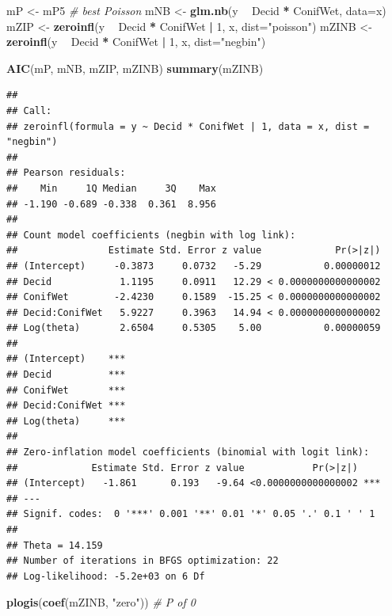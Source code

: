 \documentclass[12pt,]{book}
\newenvironment{Shaded}{\begin{snugshade}}{\end{snugshade}}
\newcommand{\CommentTok}[1]{\textcolor[rgb]{0.56,0.35,0.01}{\textit{#1}}}
\newcommand{\DataTypeTok}[1]{\textcolor[rgb]{0.13,0.29,0.53}{#1}}
\newcommand{\DecValTok}[1]{\textcolor[rgb]{0.00,0.00,0.81}{#1}}
\newcommand{\KeywordTok}[1]{\textcolor[rgb]{0.13,0.29,0.53}{\textbf{#1}}}
\newcommand{\NormalTok}[1]{#1}
\newcommand{\OperatorTok}[1]{\textcolor[rgb]{0.81,0.36,0.00}{\textbf{#1}}}
\newcommand{\StringTok}[1]{\textcolor[rgb]{0.31,0.60,0.02}{#1}}
\begin{document}
\begin{Shaded}
\begin{Highlighting}[]
\NormalTok{mP <-}\StringTok{ }\NormalTok{mP5 }\CommentTok{# best Poisson}
\NormalTok{mNB <-}\StringTok{ }\KeywordTok{glm.nb}\NormalTok{(y }\OperatorTok{~}\StringTok{ }\NormalTok{Decid }\OperatorTok{*}\StringTok{ }\NormalTok{ConifWet, }\DataTypeTok{data=}\NormalTok{x)}
\NormalTok{mZIP <-}\StringTok{ }\KeywordTok{zeroinfl}\NormalTok{(y }\OperatorTok{~}\StringTok{ }\NormalTok{Decid }\OperatorTok{*}\StringTok{ }\NormalTok{ConifWet }\OperatorTok{|}\StringTok{ }\DecValTok{1}\NormalTok{, x, }\DataTypeTok{dist=}\StringTok{"poisson"}\NormalTok{)}
\NormalTok{mZINB <-}\StringTok{ }\KeywordTok{zeroinfl}\NormalTok{(y }\OperatorTok{~}\StringTok{ }\NormalTok{Decid }\OperatorTok{*}\StringTok{ }\NormalTok{ConifWet }\OperatorTok{|}\StringTok{ }\DecValTok{1}\NormalTok{, x, }\DataTypeTok{dist=}\StringTok{"negbin"}\NormalTok{)}

\KeywordTok{AIC}\NormalTok{(mP, mNB, mZIP, mZINB)}
\KeywordTok{summary}\NormalTok{(mZINB)}
\end{Highlighting}
\end{Shaded}

\begin{verbatim}
## 
## Call:
## zeroinfl(formula = y ~ Decid * ConifWet | 1, data = x, dist = "negbin")
## 
## Pearson residuals:
##    Min     1Q Median     3Q    Max 
## -1.190 -0.689 -0.338  0.361  8.956 
## 
## Count model coefficients (negbin with log link):
##                Estimate Std. Error z value             Pr(>|z|)
## (Intercept)     -0.3873     0.0732   -5.29           0.00000012
## Decid            1.1195     0.0911   12.29 < 0.0000000000000002
## ConifWet        -2.4230     0.1589  -15.25 < 0.0000000000000002
## Decid:ConifWet   5.9227     0.3963   14.94 < 0.0000000000000002
## Log(theta)       2.6504     0.5305    5.00           0.00000059
##                   
## (Intercept)    ***
## Decid          ***
## ConifWet       ***
## Decid:ConifWet ***
## Log(theta)     ***
## 
## Zero-inflation model coefficients (binomial with logit link):
##             Estimate Std. Error z value            Pr(>|z|)    
## (Intercept)   -1.861      0.193   -9.64 <0.0000000000000002 ***
## ---
## Signif. codes:  0 '***' 0.001 '**' 0.01 '*' 0.05 '.' 0.1 ' ' 1 
## 
## Theta = 14.159 
## Number of iterations in BFGS optimization: 22 
## Log-likelihood: -5.2e+03 on 6 Df
\end{verbatim}

\begin{Shaded}
\begin{Highlighting}[]
\KeywordTok{plogis}\NormalTok{(}\KeywordTok{coef}\NormalTok{(mZINB, }\StringTok{"zero"}\NormalTok{)) }\CommentTok{# P of 0}
\end{Highlighting}
\end{Shaded}
\end{document}
